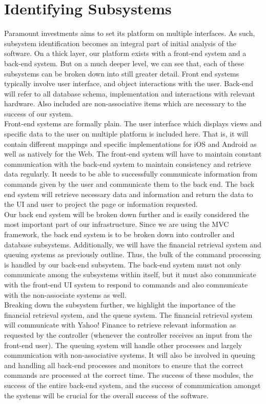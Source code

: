 \section{Identifying Subsystems}

Paramount investments aims to set its platform on multiple interfaces.
As such, subsystem identification becomes an integral part of initial
analysis of the software. On a thick layer, our platform exists with
a front-end system and a back-end system. But on a much deeper level,
we can see that, each of these subsystems can be broken down into
still greater detail. Front end systems typically involve user
interface, and object interactions with the user. Back-end will refer
to all database schema, implementation and interactions with relevant
hardware. Also included are non-associative items which are necessary
to the success of our system.\\

Front-end systems are formally plain. The user interface which displays
views and specific data to the user on multiple platform is included
here. That is, it will contain different mappings and specific
implementations for iOS and Android as well as natively for the Web.
The front-end system will have to maintain constant communication
with the back-end system to maintain consistency and retrieve data
regularly. It needs to be able to successfully communicate information
from commands given by the user and communicate them to the back end.
The back end system will retrieve necessary data and information and
return the data to the UI and user to project the page or information
requested.\\

Our back end system will be broken down further and is easily
considered the most important part of our infrastructure. Since
we are using the MVC framework, the back end system is to be broken
down into controller and database subsystems. Additionally, we will
have the financial retrieval system and queuing systems as previously
outline. Thus, the bulk of the command processing is handled by our
back-end subsystem.  The back-end system must not only communicate
among the subsystems within itself, but it must also communicate with
the front-end UI system to respond to commands and also communicate
with the non-associate systems as well.\\

Breaking down the subsystem further, we highlight the importance
of the financial retrieval system, and the queue system. The
financial retrieval system will communicate with Yahoo! Finance
to retrieve relevant information as requested by the controller
(whenever the controller receives an input from the front-end user).
The queuing system will handle other processes and largely
communication with non-associative systems. It will also be
involved in queuing and handling all back-end processes and
monitors to ensure that the correct commands are processed at the
correct time. The success of these modules, the success of the entire
back-end system, and the success of communication amongst the
systems will be crucial for the overall success of the software.

